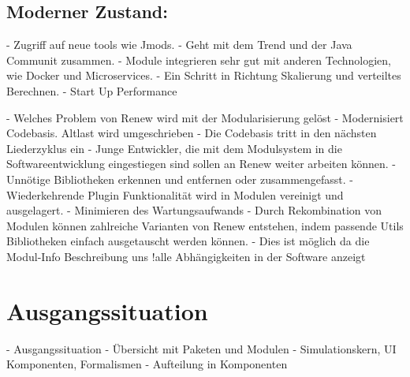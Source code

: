 \subsection{Moderner Zustand:} \label{sub:moderner_zustand_}
	- Zugriff auf neue tools wie Jmods.
	- Geht mit dem Trend und der Java Communit zusammen. 
	- Module integrieren sehr gut mit anderen Technologien, wie Docker und Microservices.
	- Ein Schritt in Richtung Skalierung und verteiltes Berechnen. 
	- Start Up Performance 



	- Welches Problem von Renew wird mit der Modularisierung gelöst 
		- Modernisiert Codebasis. Altlast wird umgeschrieben
		- Die Codebasis tritt in den nächsten Liederzyklus ein
		- Junge Entwickler, die mit dem Modulsystem in die Softwareentwicklung eingestiegen sind sollen an Renew weiter arbeiten können. 
		- Unnötige Bibliotheken erkennen und entfernen oder zusammengefasst.
		- Wiederkehrende Plugin Funktionalität wird in Modulen vereinigt und ausgelagert.
		- Minimieren des Wartungsaufwands 
		- Durch Rekombination von Modulen können zahlreiche Varianten von Renew entstehen, indem passende Utils Bibliotheken einfach ausgetauscht werden können. 
		-  Dies ist möglich da die Modul-Info Beschreibung uns !alle Abhängigkeiten in der Software anzeigt 




\section{Ausgangssituation} \label{sec:ausgangssituation}
	- Ausgangssituation
		- Übersicht mit Paketen und Modulen 
		- Simulationskern, UI Komponenten, Formalismen   
	- Aufteilung in Komponenten 

